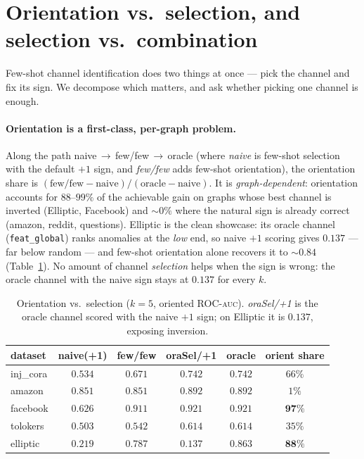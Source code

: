 \documentclass[11pt]{article}
\newcommand{\auc}{\textsc{auc}}
\begin{document}
\section{Orientation vs.\ selection, and selection vs.\ combination}
\label{sec:orientation}

Few-shot channel identification does two things at once --- pick the channel and fix its sign.
We decompose which matters, and ask whether picking one channel is enough.

\paragraph{Orientation is a first-class, per-graph problem.} Along the path
naive$\,\to\,$few/few$\,\to\,$oracle (where \emph{naive} is few-shot selection with the
default $+1$ sign, and \emph{few/few} adds few-shot orientation), the orientation share is
$(\text{few/few}-\text{naive})/(\text{oracle}-\text{naive})$. It is \emph{graph-dependent}:
orientation accounts for $88$--$99\%$ of the achievable gain on graphs whose best channel is
inverted (Elliptic, Facebook) and ${\sim}0\%$ where the natural sign is already correct
(amazon, reddit, questions). Elliptic is the clean showcase: its oracle channel
(\texttt{feat\_global}) ranks anomalies at the \emph{low} end, so naive $+1$ scoring gives
$0.137$ --- far below random --- and few-shot orientation alone recovers it to ${\sim}0.84$
(Table~\ref{tab:orient}). No amount of channel \emph{selection} helps when the sign is wrong:
the oracle channel with the naive sign stays at $0.137$ for every $k$.

\begin{table}[t]
\centering
\caption{Orientation vs.\ selection ($k{=}5$, oriented ROC-\auc{}). \emph{oraSel/+1} is the
oracle channel scored with the naive $+1$ sign; on Elliptic it is $0.137$, exposing inversion.}
\label{tab:orient}
\begin{tabular}{lccccc}
\toprule
dataset & naive(+1) & few/few & oraSel/+1 & oracle & orient share \\
\midrule
inj\_cora & $0.534$ & $0.671$ & $0.742$ & $0.742$ & $66\%$ \\
amazon   & $0.851$ & $0.851$ & $0.892$ & $0.892$ & $1\%$ \\
facebook & $0.626$ & $0.911$ & $0.921$ & $0.921$ & $\mathbf{97\%}$ \\
tolokers & $0.503$ & $0.542$ & $0.614$ & $0.614$ & $35\%$ \\
elliptic & $\mathbf{0.219}$ & $0.787$ & $\mathbf{0.137}$ & $0.863$ & $\mathbf{88\%}$ \\
\bottomrule
\end{tabular}
\end{table}
\end{document}
